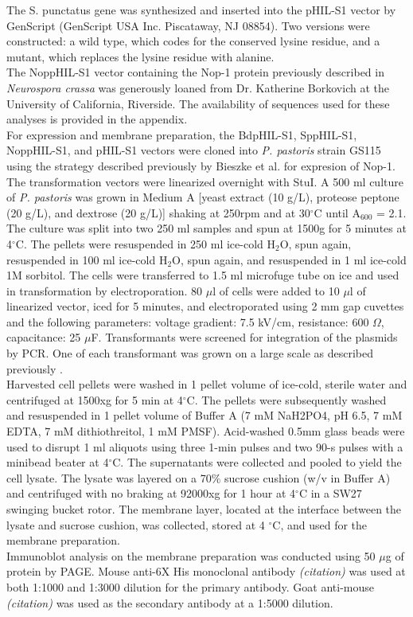 \indent The S. punctatus gene was synthesized and inserted into the pHIL-S1 vector by GenScript (GenScript USA Inc. Piscataway, NJ 08854). Two versions were constructed: a wild type, which codes for the conserved lysine residue, and a mutant, which replaces the lysine residue with alanine.  \\
\indent The NoppHIL-S1 vector containing the Nop-1 protein previously described in \textit{Neurospora crassa} \cite{Bieszke1999} was generously loaned from Dr. Katherine Borkovich at the University of California, Riverside. The availability of sequences used for these analyses is provided in the appendix.\\
\indent For expression and membrane preparation, the BdpHIL-S1, SppHIL-S1, NoppHIL-S1, and pHIL-S1 vectors were cloned into \textit{P. pastoris} strain GS115 using the strategy described previously by Bieszke et al. \nocite{Bieszke1999} for expresion of Nop-1. The transformation vectors were linearized overnight with StuI. A 500 ml culture of \textit{P. pastoris} was grown in Medium A [yeast extract (10 g/L), proteose peptone (20 g/L), and dextrose (20 g/L)] shaking at 250rpm and at 30$^{\circ}$C until A$_{600}$ = 2.1. The culture was split into two 250 ml samples and spun at 1500g for 5 minutes at 4$^{\circ}$C. The pellets were resuspended in 250 ml ice-cold H$_{2}$O, spun again, resuspended in 100 ml ice-cold H$_{2}$O, spun again, and resuspended in 1 ml ice-cold 1M sorbitol. The cells were transferred to 1.5 ml microfuge tube on ice and used in transformation by electroporation. 80 $\mu$l of cells were added to 10 $\mu$l of linearized vector, iced for 5 minutes, and electroporated using 2 mm gap cuvettes and the following parameters: voltage gradient: 7.5 kV/cm, resistance: 600 $\Omega$, capacitance: 25 $\mu$F. Transformants were screened for integration of the plasmids by PCR. One of each transformant was grown on a large scale as described previously \cite{Bieszke1999}.\\
\indent Harvested cell pellets were washed in 1 pellet volume of ice-cold, sterile water and centrifuged at 1500xg for 5 min at 4$^{\circ}$C. The pellets were subsequently washed and resuspended in 1 pellet volume of Buffer A (7 mM NaH2PO4, pH 6.5, 7 mM EDTA, 7 mM dithiothreitol, 1 mM PMSF). Acid-washed 0.5mm glass beads were used to disrupt 1 ml aliquots using three 1-min pulses and two 90-s pulses with a minibead beater at 4$^{\circ}$C. The supernatants were collected and pooled to yield the cell lysate. The lysate was layered on a 70\% sucrose cushion (w/v in Buffer A) and centrifuged with no braking at 92000xg for 1 hour at 4$^{\circ}$C in a SW27 swinging bucket rotor.  The membrane layer, located at the interface between the lysate and sucrose cushion, was collected, stored at 4 $^{\circ}$C, and used for the membrane preparation.\\
\indent Immunoblot analysis on the membrane preparation was conducted using 50 $\mu$g of protein by PAGE. Mouse anti-6X His monoclonal antibody \emph{(citation)} was used at both 1:1000 and 1:3000 dilution for the primary antibody. Goat anti-mouse \emph{(citation)} was used as the secondary antibody at a 1:5000 dilution.\\
